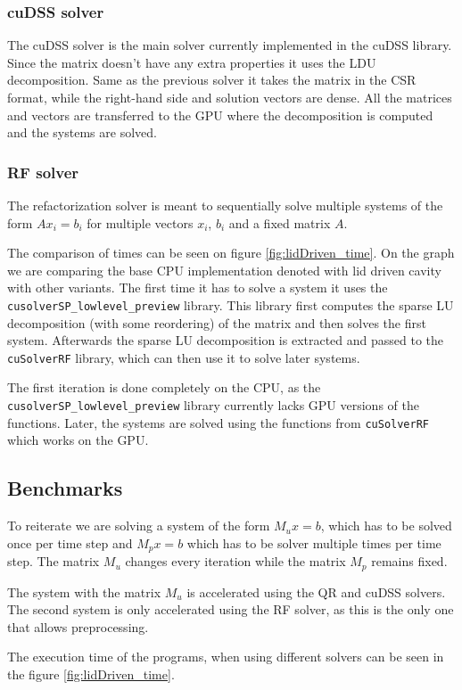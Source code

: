 \documentclass{article}
\begin{document}
\subsubsection{cuDSS solver}
The cuDSS solver is the main solver currently implemented in the cuDSS library. Since the matrix 
doesn't have any extra properties it uses the LDU decomposition. Same as the previous 
solver it takes the matrix in the CSR format, while the right-hand side and solution vectors
are dense. All the matrices and vectors are transferred to the GPU where the decomposition is 
computed and the systems are solved.
\subsubsection{RF solver}
The refactorization solver is meant to sequentially solve multiple systems of the form 
\(A x_i = b_i\) for multiple vectors \(x_i\), \(b_i\) and a fixed matrix \(A\). 

The comparison of times can be seen on figure \ref{fig:lidDriven_time}. On the graph we are comparing 
the base CPU implementation denoted with lid driven cavity with other variants. The first time 
it has to solve a system it uses the \verb|cusolverSP_lowlevel_preview| library. This library 
first computes the sparse LU decomposition (with some reordering) of the matrix and then solves the 
first system.
Afterwards the sparse LU  decomposition is extracted and passed to the \verb|cuSolverRF| library,
which can then use it to solve later systems.

The first iteration is done completely on the CPU, as the \verb|cusolverSP_lowlevel_preview| library
currently lacks GPU versions of the functions. Later, the systems are solved using the functions 
from \verb|cuSolverRF| which works on the GPU.

\subsection{Benchmarks}
To reiterate we are solving a system of the form \(M_u x = b\), which has to be solved once per time step
and \(M_p x = b\) which has to be solver multiple times per time step. The matrix \(M_u\) changes
every iteration while the matrix \(M_p\) remains fixed.

The system with the matrix \(M_u\) is accelerated using the QR and cuDSS solvers.
The second system is only accelerated using the RF solver, as this is the only one that allows 
preprocessing. 

The execution time of the programs, when using different solvers can be seen in the
figure \ref{fig:lidDriven_time}.
\end{document}
